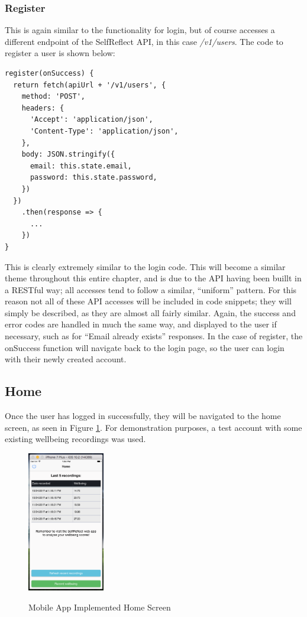 \documentclass[11pt,openright,a4paper]{report}
\begin{document}
\newpage
\subsubsection{Register}
This is again similar to the functionality for login, but of course accesses a different endpoint of the SelfReflect API, in this case \emph{/v1/users}. The code to register a user is shown below:
\begin{lstlisting}
register(onSuccess) {
  return fetch(apiUrl + '/v1/users', {
    method: 'POST',
    headers: {
      'Accept': 'application/json',
      'Content-Type': 'application/json',
    },
    body: JSON.stringify({
      email: this.state.email,
      password: this.state.password,
    })
  })
    .then(response => {
      ...
    })
}
\end{lstlisting}

This is clearly extremely similar to the login code. This will become a similar theme throughout this entire chapter, and is due to the API having been buillt in a RESTful way; all accesses tend to follow a similar, \enquote{uniform} pattern. For this reason not all of these API accesses will be included in code snippets; they will simply be described, as they are almost all fairly similar. Again, the success and error codes are handled in much the same way, and displayed to the user if necessary, such as for \enquote{Email already exists} responses. In the case of register, the onSuccess function will navigate back to the login page, so the user can login with their newly created account.

\subsection{Home}
Once the user has logged in successfully, they will be navigated to the home screen, as seen in Figure \ref{fig:mobilehomeimpl}. For demonstration purposes, a test account with some existing wellbeing recordings was used.

\begin{figure}[ht]
\centering
\caption{Mobile App Implemented Home Screen}
\includegraphics[width=0.3\textwidth]{i/mobilehomeimpl.png}
\label{fig:mobilehomeimpl}
\end{figure}
\end{document}
